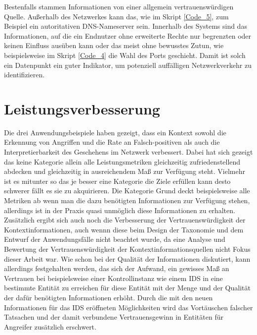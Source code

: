 Bestenfalls stammen Informationen von einer allgemein vertrauenswürdigen Quelle. Außerhalb des Netzwerkes kann das, wie im Skript \ref{Code_5}, zum Beispiel ein autoritativen DNS-Nameserver sein. Innerhalb des Systems sind das Informationen, auf die ein Endnutzer ohne erweiterte Rechte nur begrenzten oder keinen Einfluss ausüben kann oder das meist ohne bewusstes Zutun, wie beispielsweise im Skript \ref{Code_4} die Wahl des Ports geschieht. Damit ist solch ein Datenpunkt ein guter Indikator, um potenziell auffälligen Netzwerkverkehr zu identifizieren.
\section{Leistungsverbesserung}
Die drei Anwendungsbeispiele haben gezeigt, dass ein Kontext sowohl die Erkennung von Angriffen und die Rate an Falsch-positiven als auch die Interpretierbarkeit des Geschehens im Netzwerk verbessert. Dabei hat sich gezeigt das keine Kategorie allein alle Leistungsmetriken gleichzeitig zufriedenstellend abdecken und gleichzeitig in ausreichendem Maß zur Verfügung steht. Vielmehr ist es mitunter so das je besser eine Kategorie die Ziele erfüllen kann desto schwerer fällt es sie zu akquirieren. Die Kategorie Grund deckt beispielsweise alle Metriken ab wenn man die dazu benötigten Informationen zur Verfügung stehen, allerdings ist in der Praxis quasi unmöglich diese Informationen zu erhalten.
Zusätzlich ergibt sich auch noch die Verbesserung der Vertrauenswürdigkeit der Kontextinformationen, auch wennn diese beim Design der Taxonomie und dem Entwurf der Anwendungsfälle nicht beachtet wurde, da eine Analyse und Bewertung der Vertrauenswürdigkeit der Kontextinformationsquellen nicht Fokus dieser Arbeit war. Wie schon bei der Qualität der Informationen diskutiert, kann allerdings festgehalten werden, das sich der Aufwand, ein gewisses Maß an Vertrauen bei beispielsweise einer Kontrollinstanz wie einem IDS in eine bestimmte Entität zu erreichen für diese Entität mit der Menge und der Qualität der dafür benötigten Informationen erhöht. Durch die mit den neuen Informationen für das IDS eröffneten Möglichkeiten wird das Vortäuschen falscher Tatsachen und der damit verbundene Vertrauensgewinn in Entitäten für Angreifer zusätzlich erschwert.